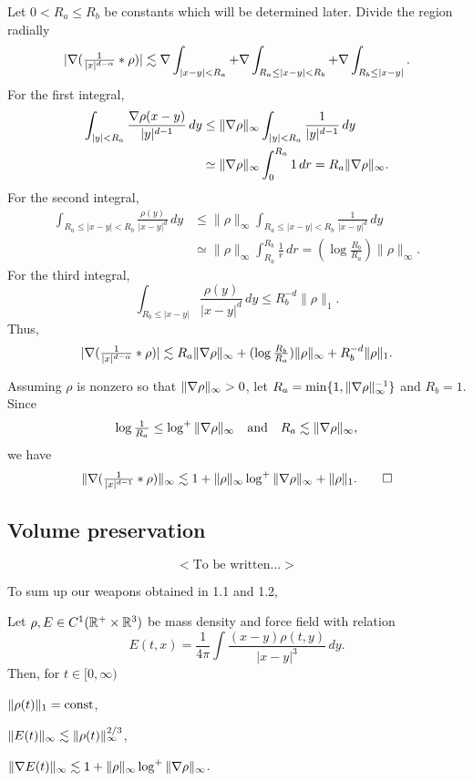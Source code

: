\documentclass[11pt]{amsart}
\begin{document}
\begin{pfs}
\item
Let $0<R_a\le R_b$ be constants which will be determined later.
Divide the region radially
\begin{align*}
|\nabla(\tfrac1{|x|^{d-\alpha}}*\rho)|\lesssim\nabla\int_{|x-y|<R_a}+\nabla\int_{R_a\le|x-y|<R_b}+\nabla\int_{R_b\le|x-y|}.
\end{align*}
For the first integral,
\begin{align*}
\int_{|y|<R_a}\frac{\nabla\rho(x-y)}{|y|^{d-1}}\,dy
&\le\|\nabla\rho\|_\infty\int_{|y|<R_a}\frac1{|y|^{d-1}}\,dy\\
&\simeq\|\nabla\rho\|_\infty\int_0^{R_a}1\,dr
=R_a\|\nabla\rho\|_\infty.
\end{align*}
For the second integral,
\begin{align*}
\int_{R_a\le|x-y|<R_b}\frac{\rho(y)}{|x-y|^d}\,dy
&\le\|\rho\|_\infty\int_{R_a\le|x-y|<R_b}\frac1{|x-y|^d}\,dy\\
&\simeq\|\rho\|_\infty\int_{R_a}^{R_b}\frac1r\,dr
=(\log\tfrac{R_b}{R_a})\|\rho\|_\infty.
\end{align*}
For the third integral,
\[\int_{R_b\le|x-y|}\frac{\rho(y)}{|x-y|^d}\,dy\le R_b^{-d}\|\rho\|_1.\]
Thus,
\[|\nabla(\tfrac1{|x|^{d-\alpha}}*\rho)|\lesssim R_a\|\nabla\rho\|_\infty+(\log\tfrac{R_b}{R_a})\|\rho\|_\infty+R_b^{-d}\|\rho\|_1.\]

Assuming $\rho$ is nonzero so that $\|\nabla\rho\|_\infty>0$, let $R_a=\min\{1,\|\nabla\rho\|_\infty^{-1}\}$ and $R_b=1$.
Since
\[\log\tfrac1{R_a}\le\log^+\|\nabla\rho\|_\infty\quad\text{and}\quad R_a\lesssim\|\nabla\rho\|_\infty,\]
we have
\[\|\nabla(\tfrac1{|x|^{d-1}}*\rho)\|_\infty\lesssim1+\|\rho\|_\infty\log^+\|\nabla\rho\|_\infty+\|\rho\|_1.\qedhere\]
\end{pfs}

\subsection{Volume preservation}

\[<\text{To be written...}>\]

To sum up our weapons obtained in 1.1 and 1.2,
\begin{cor}
Let $\rho,E\in C^1(\mathbb{R}^+\times\mathbb{R}^3)$ be mass density and force field with relation
\[E(t,x)=\frac1{4\pi}\int\frac{(x-y)\rho(t,y)}{|x-y|^3}\,dy.\]
Then, for $t\in[0,\infty)$
\begin{cond}
\item $\|\rho(t)\|_1=\operatorname{const}$,
\item $\|E(t)\|_\infty\lesssim\|\rho(t)\|_\infty^{2/3}$,
\item $\|\nabla E(t)\|_\infty\lesssim1+\|\rho\|_\infty\log^+\|\nabla\rho\|_\infty$.
\end{cond}
\end{cor}
\end{document}
